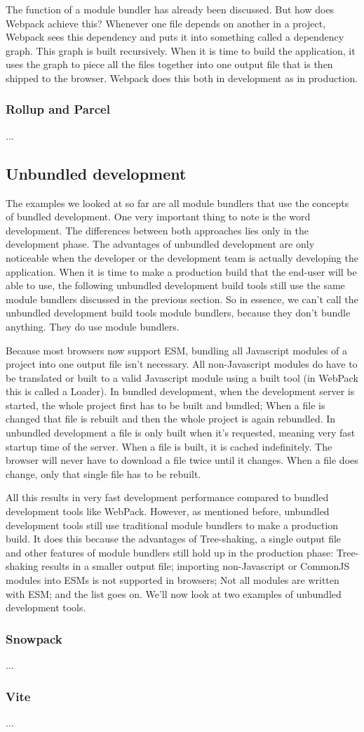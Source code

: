 The function of a module bundler has already been discussed. But how does Webpack achieve this? Whenever one file depends on another in a project, Webpack sees this dependency and puts it into something called a dependency graph. 
This graph is built recursively. When it is time to build the application, it uses the graph to piece all the files together into one output file that is then shipped to the browser. Webpack does this both in development as in production. 

\subsubsection{Rollup and Parcel}
...
\subsection{Unbundled development}

The examples we looked at so far are all module bundlers that use the concepts of bundled development. One very important thing to note is the word development. The differences between both approaches lies only in the development phase. The advantages of unbundled development are only noticeable when the developer or the development team is actually developing the application. When it is time to make a production build that the end-user will be able to use, the following unbundled development build tools still use the same module bundlers discussed in the previous section. So in essence, we can’t call the unbundled development build tools module bundlers, because they don’t bundle anything. They do use module bundlers.

Because most browsers now support ESM, bundling all Javascript modules of a project into one output file isn’t necessary. All non-Javascript modules do have to be translated or built to a valid Javascript module using a built tool (in WebPack this is called a Loader). In bundled development, when the development server is started, the whole project first has to be built and bundled; When a file is changed that file is rebuilt and then the whole project is again rebundled. In unbundled development a file is only built when it’s requested, meaning very fast startup time of the server. When a file is built, it is cached indefinitely. The browser will never have to download a file twice until it changes. When a file does change, only that single file has to be rebuilt. 

All this results in very fast development performance compared to bundled development tools like WebPack. However, as mentioned before, unbundled development tools still use traditional module bundlers to make a production build. It does this because the advantages of Tree-shaking, a single output file and other features of module bundlers still hold up in the production phase: Tree-shaking results in a smaller output file; importing non-Javascript or CommonJS modules into ESMs is not supported in browsers; Not all modules are written with ESM; and the list goes on. We’ll now look at two examples of unbundled development tools.

\subsubsection{Snowpack}
...
\subsubsection{Vite}
...